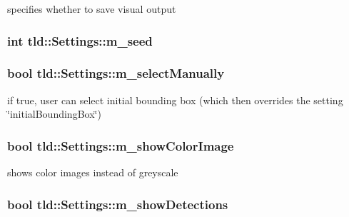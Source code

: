 specifies whether to save visual output 

\hypertarget{classtld_1_1_settings_a07dc62407c3373e7fa3906c145593b69}{
\subsubsection[{m\_\-seed}]{\setlength{\rightskip}{0pt plus 5cm}int {\bf tld::Settings::m\_\-seed}}}
\label{classtld_1_1_settings_a07dc62407c3373e7fa3906c145593b69}
\hypertarget{classtld_1_1_settings_afadc64d205d5386d94088e87dba72519}{
\subsubsection[{m\_\-selectManually}]{\setlength{\rightskip}{0pt plus 5cm}bool {\bf tld::Settings::m\_\-selectManually}}}
\label{classtld_1_1_settings_afadc64d205d5386d94088e87dba72519}


if true, user can select initial bounding box (which then overrides the setting \char`\"{}initialBoundingBox\char`\"{}) 

\hypertarget{classtld_1_1_settings_a495b2aba7d0c9ec5fb914ab04b6d42cf}{
\subsubsection[{m\_\-showColorImage}]{\setlength{\rightskip}{0pt plus 5cm}bool {\bf tld::Settings::m\_\-showColorImage}}}
\label{classtld_1_1_settings_a495b2aba7d0c9ec5fb914ab04b6d42cf}


shows color images instead of greyscale 

\hypertarget{classtld_1_1_settings_abcc93dd632486081ba14ebfaaaecd392}{
\subsubsection[{m\_\-showDetections}]{\setlength{\rightskip}{0pt plus 5cm}bool {\bf tld::Settings::m\_\-showDetections}}}
\label{classtld_1_1_settings_abcc93dd632486081ba14ebfaaaecd392}


